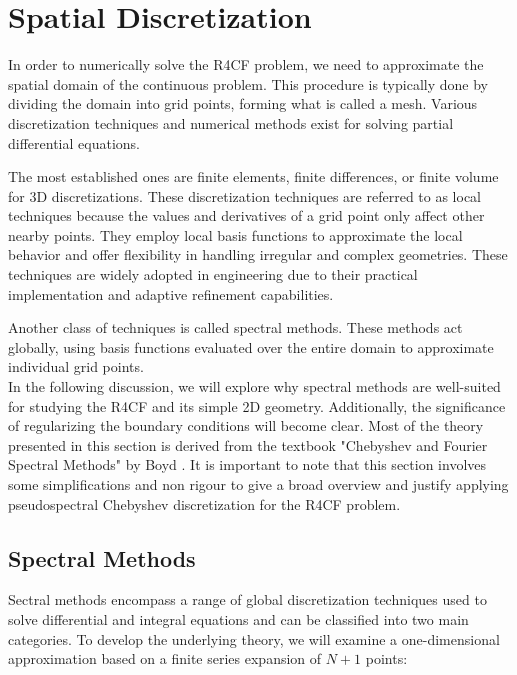 
\section{Spatial Discretization} \label{sec:spectral}

In order to numerically solve the R4CF problem, we need to approximate the
spatial domain of the continuous problem. This procedure is typically done by
dividing the domain into grid points, forming what is called a mesh. Various
discretization techniques and numerical methods exist for solving partial
differential equations.

The most established ones are finite elements, finite differences, or finite
volume for 3D discretizations. These discretization techniques are referred to
as local techniques because the values and derivatives of a grid point only
affect other nearby points. They employ local basis functions to approximate
the local behavior and offer flexibility in handling irregular and complex
geometries. These techniques are widely adopted in engineering due to their
practical implementation and adaptive refinement capabilities.

Another class of techniques is called spectral methods. These methods act
globally, using basis functions evaluated over the entire domain to approximate
individual grid points. \\

In the following discussion, we will explore why spectral methods are
well-suited for studying the R4CF and its simple 2D geometry. Additionally, the
significance of regularizing the boundary conditions will become clear. Most of
the theory presented in this section is derived from the textbook "Chebyshev
and Fourier Spectral Methods" by Boyd \citep{boyd2001}. It is important to note
that this section involves some simplifications and non rigour to give a broad
overview and justify applying pseudospectral Chebyshev discretization for the
R4CF problem.

\subsection{Spectral Methods}

Sectral methods encompass a range of global discretization techniques used to
solve differential and integral equations and can be classified into two main
categories. To develop the underlying theory, we will examine a one-dimensional
approximation based on a finite series expansion of $N+1$ points:

